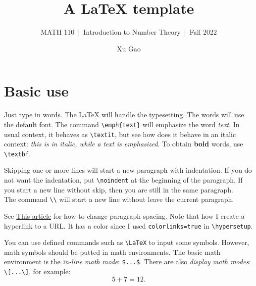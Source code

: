 \documentclass[11pt]{article}
\title{A {\LaTeX} template}
\author{Xu Gao}
\subtitle{MATH 110~|~Introduction to Number Theory~|~Fall 2022}
\theoremstyle{plain}
\theoremstyle{definition}
\theoremstyle{remark}
\numberwithin{equation}{problem}
\begin{document}
\maketitle

\section{Basic use}
Just type in words. The {\LaTeX} will handle the typesetting. 
The words will use the default font. 
The command \verb|\emph{text}| will emphasize the word \emph{text}. 
In usual context, it behaves as \verb|\textit|, but see how does it behave in an italic context: \textit{this is in italic, while a \emph{text} is emphasized}. 
To obtain \textbf{bold} words, use \verb|\textbf|. 

Skipping one or more lines will start a new paragraph with indentation. 
If you do not want the indentation, put \verb|\noindent| at the beginning of the paragraph. 
If you start a new line without skip, then you are still in the same paragraph. \\
The command \verb|\\| will start a new line without leave the current paragraph. 

See \href{https://www.overleaf.com/learn/latex/Articles/How_to_change_paragraph_spacing_in_LaTeX}{This article} for how to change paragraph spacing. Note that how I create a hyperlink to a URL. It has a color since I used \verb|colorlinks=true| in \verb|\hypersetup|.

You can use defined commands such as \verb|\LaTeX| to input some symbols. 
However, math symbols should be putted in math environments. 
The basic math environment is the \emph{in-line math mode}: \verb|$...$|. There are also \emph{display math modes}: \verb|\[...\]|, for example:
\[
	5+7=12.
\] 
\end{document}
